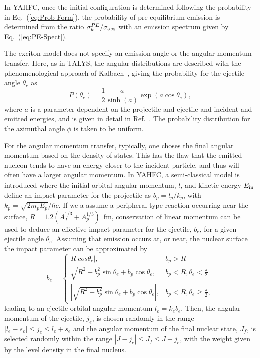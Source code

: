 \documentclass[
10pt,
showpacs,preprintnumbers,footinbib,
amsfonts,amsmath,amssymb,
aps,
prc,twocolumn,groupedaddress,superscriptaddress,
showkeys,
nofootinbib
]{revtex4-1}
\begin{document}
In YAHFC, once the initial configuration is determined following the probability in Eq.~(\ref{eq:Prob-Form}), the probability of pre-equilibrium emission is determined from the ratio $\sigma^{PE}_k/\sigma_{\rm abs}$ with an emission spectrum given by Eq.~(\ref{eq:PE-Spect}).

The exciton model does not specify an emission angle or the angular momentum transfer. Here, as in TALYS, the angular distributions are described with the phenomenological approach of Kalbach~\cite{Kalbach:1988}, giving the probability for the ejectile angle $\theta_e$  as
\begin{equation}
P(\theta_e) = \frac{1}{2} \frac{a}{\sinh(a)}\exp(a\cos \theta_e),
\label{eq:PE-Ang}
\end{equation}
where $a$ is a parameter dependent on the projectile and ejectile and incident and emitted energies, and is given in detail in Ref.~\cite{Kalbach:1988}. The probability distribution for the azimuthal angle $\phi$ is taken to be uniform.

For the angular momentum transfer, typically, one choses the final angular momentum based on the density of states. This has the flaw that the emitted nucleon tends to have an energy closer to the incident particle, and thus will often have a larger angular momentum. In YAHFC, a semi-classical model is introduced where the initial orbital angular momentum, $l$, and kinetic energy $E_{\rm in}$ define an impact parameter for the projectile as $b_p = l_p/k_p$, with $k_p = \sqrt{2m_pE_p}/\hbar c$. If we a assume a peripheral-type reaction occurring near the surface, $R = 1.2 (A_T^{1/3} + A_p^{1/3})$~fm, conservation of linear momentum can be used to deduce an effective impact parameter for the ejectile, $b_e$, for a given ejectile angle $\theta_e$. Assuming that emission occurs at, or near, the nuclear surface the impact parameter can be approximated by
\begin{equation}
b_e = 
\begin{cases}
R |cos\theta_e |,     &  b_p > R \\
 \sqrt{R^2-b_p^2}\sin\theta_e + b_p\cos\theta_e,       &   b_p < R, \theta_e < \frac{\pi}{2} \\
\left |\sqrt{R^2-b_p^2}\sin\theta_e + b_p\cos\theta_e \right |,      &    b_p < R, \theta_e \ge \frac{\pi}{2},
 \end{cases}
\end{equation} 
leading to an ejectile orbital angular momentum $l_e = k_eb_e$. Then, the angular momentum of the ejectile, $j_e$, is chosen randomly in the range $|l_e-s_e| \le j_e \le l_e+s_e$ and the angular momentum of the final nuclear state, $J_f$, is selected randomly within the range $|J-j_e| \le J_f \le J+j_e$, with the weight given by the level density in the final nucleus.
\end{document}
